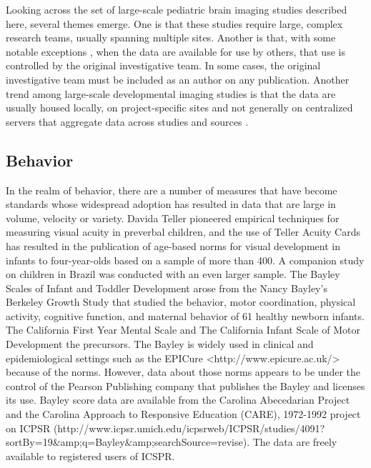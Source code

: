 \documentclass[letterpaper,man,apacite]{apa6}
\begin{document}
Looking across the set of large-scale pediatric brain imaging studies described here, several themes emerge.
One is that these studies require large, complex research teams, usually spanning multiple sites.
Another is that, with some notable exceptions \cite{richards_database_2015}, when the data are available for use by others, that use is controlled by the original investigative team.
In some cases, the original investigative team must be included as an author on any publication.
Another trend among large-scale developmental imaging studies is that the data are usually housed locally, on project-specific sites and not generally on centralized servers that aggregate data across studies and sources \cite{openfmri.org, neurovault.org}.

\subsection{Behavior}

In the realm of behavior, there are a number of measures that have become standards whose widespread adoption has resulted in data that are large in volume, velocity or variety.
Davida Teller pioneered empirical techniques for measuring visual acuity in preverbal children, and the use of Teller Acuity Cards has resulted in the publication of age-based norms for visual development in infants to four-year-olds \cite{mayer_monocular_1995} based on a sample of more than 400.
A companion study on children in Brazil \cite{salomao_large_1995} was conducted with an even larger sample.
The Bayley Scales of Infant and Toddler Development \cite{bayley2006bayley} arose from the Nancy Bayley's Berkeley Growth Study \cite{jones_berkeley_1941} that studied the behavior, motor coordination, physical activity, cognitive function, and maternal behavior of 61 healthy newborn infants.
The California First Year Mental Scale \cite{bayley1933california} and The California Infant Scale of Motor Development \cite{bayley1936california} the precursors.
The Bayley is widely used in clinical and epidemiological settings such as the EPICure <http://www.epicure.ac.uk/> because of the norms.
However, data about those norms appears to be under the control of the Pearson Publishing company that publishes the Bayley and licenses its use.
Bayley score data are available from the Carolina Abecedarian Project and the Carolina Approach to Responsive Education (CARE), 1972-1992 project on ICPSR (http://www.icpsr.umich.edu/icpsrweb/ICPSR/studies/4091?sortBy=19&amp;q=Bayley&amp;searchSource=revise).
The data are freely available to registered users of ICSPR. 
\end{document}
